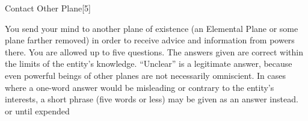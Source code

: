 \begin{spellsection}{Contact Other Plane}[5]
    \begin{spellheader}
    \end{spellheader}
    \begin{spellcontent}
        \begin{spelltargetinginfo}
        \end{spelltargetinginfo}
        \begin{spelleffects}
            \spelleffect You send your mind to another plane of existence (an Elemental Plane or some plane farther removed) in order to receive advice and information from powers there. You are allowed up to five questions. The answers given are correct within the limits of the entity's knowledge. ``Unclear'' is a legitimate answer, because even powerful beings of other planes are not necessarily omniscient. In cases where a one-word answer would be misleading or contrary to the entity's interests, a short phrase (five words or less) may be given as an answer instead.
            \spelldur \durmed or until expended
        \end{spelleffects}
    \end{spellcontent}
    \begin{spellfooter}
    \end{spellfooter}
\end{spellsection}

